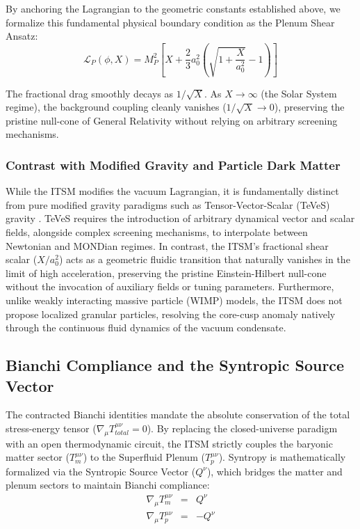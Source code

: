 \documentclass[aps,prd,10pt,twocolumn,superscriptaddress,nofootinbib]{revtex4-2}
\begin{document}
By anchoring the Lagrangian to the geometric constants established above, we formalize this fundamental physical boundary condition as the Plenum Shear Ansatz:
\begin{equation} \label{eq:plenum_shear_ansatz}
\mathcal{L}_P(\phi, X) = M_P^2 \left[ X + \frac{2}{3}a_0^2 \left(\sqrt{1+\frac{X}{a_0^2}} - 1 \right) \right]
\end{equation}

The fractional drag smoothly decays as $1/\sqrt{X}$. As $X \rightarrow \infty$ (the Solar System regime), the background coupling cleanly vanishes ($1/\sqrt{X} \rightarrow 0$), preserving the pristine null-cone of General Relativity without relying on arbitrary screening mechanisms.

\subsubsection{Contrast with Modified Gravity and Particle Dark Matter}
While the ITSM modifies the vacuum Lagrangian, it is fundamentally distinct from pure modified gravity paradigms such as Tensor-Vector-Scalar (TeVeS) gravity \cite{teves}. TeVeS requires the introduction of arbitrary dynamical vector and scalar fields, alongside complex screening mechanisms, to interpolate between Newtonian and MONDian regimes. In contrast, the ITSM's fractional shear scalar ($X/a_0^2$) acts as a geometric fluidic transition that naturally vanishes in the limit of high acceleration, preserving the pristine Einstein-Hilbert null-cone without the invocation of auxiliary fields or tuning parameters. Furthermore, unlike weakly interacting massive particle (WIMP) models, the ITSM does not propose localized granular particles, resolving the core-cusp anomaly natively through the continuous fluid dynamics of the vacuum condensate.

\subsection{Bianchi Compliance and the Syntropic Source Vector}
The contracted Bianchi identities mandate the absolute conservation of the total stress-energy tensor ($\nabla_\mu T_{total}^{\mu\nu} = 0$). By replacing the closed-universe paradigm with an open thermodynamic circuit, the ITSM strictly couples the baryonic matter sector ($T_m^{\mu\nu}$) to the Superfluid Plenum ($T_p^{\mu\nu}$). Syntropy is mathematically formalized via the Syntropic Source Vector ($Q^\nu$), which bridges the matter and plenum sectors to maintain Bianchi compliance:
\begin{eqnarray}
\nabla_\mu T_m^{\mu\nu} &=& Q^\nu \\
\nabla_\mu T_p^{\mu\nu} &=& -Q^\nu
\end{eqnarray}
\end{document}
